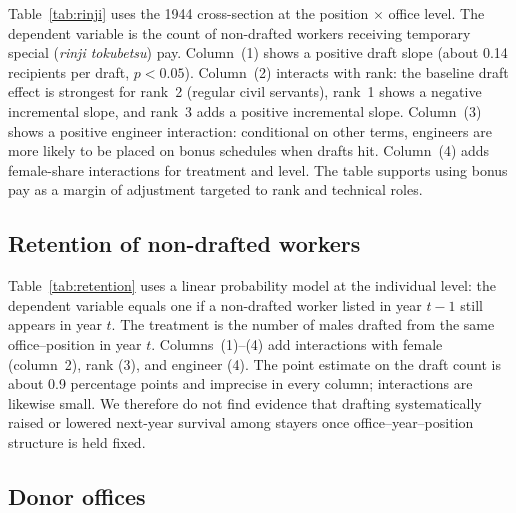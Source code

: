 Table~\ref{tab:rinji} uses the 1944 cross-section at the position $\times$ office level. The dependent variable is the count of non-drafted workers receiving temporary special (\emph{rinji tokubetsu}) pay. Column~(1) shows a positive draft slope (about 0.14 recipients per draft, $p<0.05$). Column~(2) interacts with rank: the baseline draft effect is strongest for rank~2 (regular civil servants), rank~1 shows a negative incremental slope, and rank~3 adds a positive incremental slope. Column~(3) shows a positive engineer interaction: conditional on other terms, engineers are more likely to be placed on bonus schedules when drafts hit. Column~(4) adds female-share interactions for treatment and level. The table supports using bonus pay as a margin of adjustment targeted to rank and technical roles.

\subsection{Retention of non-drafted workers}

Table~\ref{tab:retention} uses a linear probability model at the individual level: the dependent variable equals one if a non-drafted worker listed in year $t-1$ still appears in year $t$. The treatment is the number of males drafted from the same office--position in year $t$. Columns~(1)--(4) add interactions with female (column~2), rank (3), and engineer (4). The point estimate on the draft count is about 0.9 percentage points and imprecise in every column; interactions are likewise small. We therefore do not find evidence that drafting systematically raised or lowered next-year survival among stayers once office--year--position structure is held fixed.

\subsection{Donor offices}

